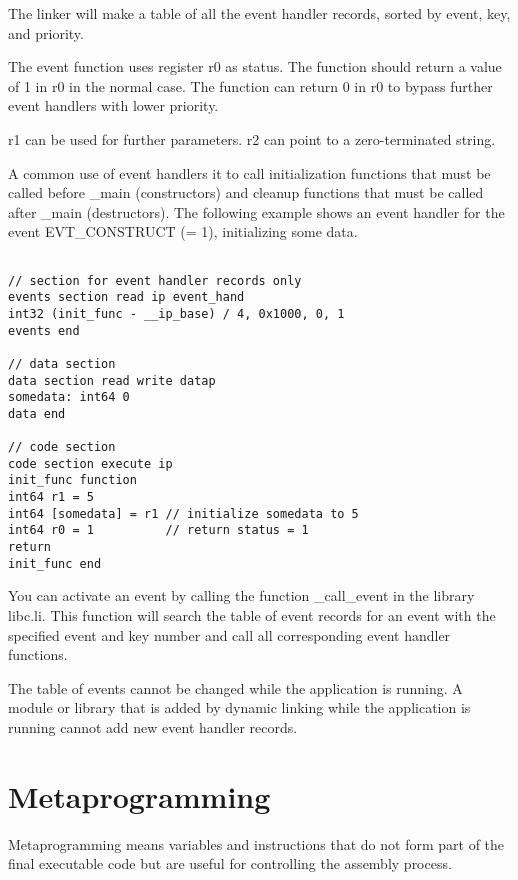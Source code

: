 \documentclass[forwardcom.tex]{subfiles}
\begin{document}
The linker will make a table of all the event handler records, sorted by event, key, and priority.
\vv

The event function uses register r0 as status. The function should 
return a value of 1 in r0 in the normal case. The function can return 0 in r0 to bypass further 
event handlers with lower priority.
\vv

r1 can be used for further parameters. r2 can point to a zero-terminated string.
\vv

A common use of event handlers it to call initialization functions that must be called before \_main (constructors) and cleanup functions that must be called after \_main (destructors). 
The following example shows an event handler for the event EVT\_CONSTRUCT (= 1), initializing some data.

\begin{example}
\label{exampleEventHandler}
\end{example} %
\begin{lstlisting}[frame=single]

// section for event handler records only
events section read ip event_hand
int32 (init_func - __ip_base) / 4, 0x1000, 0, 1
events end

// data section
data section read write datap
somedata: int64 0
data end

// code section
code section execute ip
init_func function
int64 r1 = 5
int64 [somedata] = r1 // initialize somedata to 5
int64 r0 = 1          // return status = 1
return
init_func end

\end{lstlisting}
\vspace{4mm}

You can activate an event by calling the function \_call\_event in the library libc.li.
This function will search the table of event records for an event with the specified 
event and key number and call all corresponding event handler functions.
\vv

The table of events cannot be changed while the application is running. 
A module or library that is added by dynamic linking while the application is running
cannot add new event handler records.
\vv



\section{Metaprogramming} \label{assemblyMetaprogramming}
Metaprogramming means variables and instructions that do not form part of the final executable code but 
are useful for controlling the assembly process.
\vv
\end{document}
